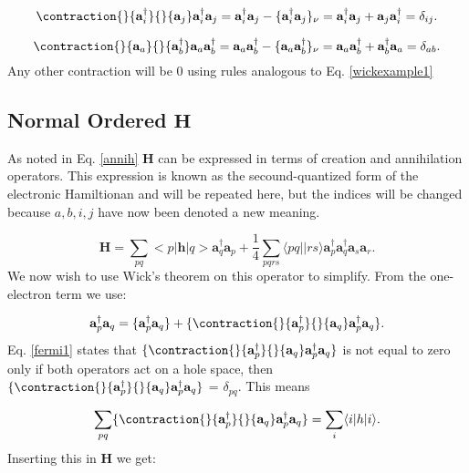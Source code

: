 \begin{equation}
\contraction{}{\textbf{a}^{\dag}_i}{}{\textbf{a}_j}
\textbf{a}^{\dag}_i \textbf{a}_j
 = \textbf{a}^{\dag}_i \textbf{a}_j
 - \{\textbf{a}^{\dag}_i \textbf{a}_j \}_{\nu} = \textbf{a}^{\dag}_i \textbf{a}_j
 +  \textbf{a}_j \textbf{a}^{\dag}_i = \delta_{ij} . \label{fermi1}
\end{equation}

\begin{equation}
\contraction{}{\textbf{a}_a}{}{\textbf{a}^{\dag}_b}
\textbf{a}_a \textbf{a}^{\dag}_b = \textbf{a}_a \textbf{a}^{\dag}_b - \{\textbf{a}_a \textbf{a}^{\dag}_b\}_{\nu} = \textbf{a}_a \textbf{a}^{\dag}_b + \textbf{a}^{\dag}_b \textbf{a}_a = \delta_{ab} . \label{fermi2}
\end{equation}
Any other contraction will be 0 using rules analogous to Eq. \eqref{wickexample1}

\subsection{Normal Ordered $\textbf{H}$}
As noted in Eq. \eqref{annih} $\textbf{H}$ can be expressed in terms of creation and annihilation operators. This expression is known as the secound-quantized form of the electronic Hamiltionan and will be repeated here, but the indices will be changed because $a,b,i,j$ have now been denoted a new meaning.

\begin{equation}
\textbf{H} = \sum_{pq} <p|\textbf{h}|q> \textbf{a}^{\dag}_q \textbf{a}_p + 
\frac{1}{4} \sum_{pqrs} \langle pq||rs \rangle \textbf{a}^{\dag}_p \textbf{a}^{\dag}_q \textbf{a}_s \textbf{a}_r .
\end{equation}
We now wish to use Wick's theorem on this operator to simplify. From the one-electron term we use:

\begin{equation}
\textbf{a}^{\dag}_p \textbf{a}_q = \{\textbf{a}^{\dag}_p \textbf{a}_q \} + \{\contraction{}{\textbf{a}^{\dag}_p}{}{\textbf{a}_q}
 \textbf{a}^{\dag}_p \textbf{a}_q 
\} . 
\end{equation}
Eq. \eqref{fermi1} states that $\{\contraction{}{\textbf{a}^{\dag}_p}{}{\textbf{a}_q}
\textbf{a}^{\dag}_p \textbf{a}_q \}$ is not equal to zero only if both operators act on a hole space, then $\{\contraction{}{\textbf{a}^{\dag}_p}{}{\textbf{a}_q}
\textbf{a}^{\dag}_p \textbf{a}_q \}$ = $\delta_{pq}$. This means 

\begin{equation}
\sum_{pq}
\{\contraction{}{\textbf{a}^{\dag}_p}{}{\textbf{a}_q}
\textbf{a}^{\dag}_p \textbf{a}_q \} = \sum_i \langle i|h|i \rangle .
\end{equation}
Inserting this in $\textbf{H}$ we get:

